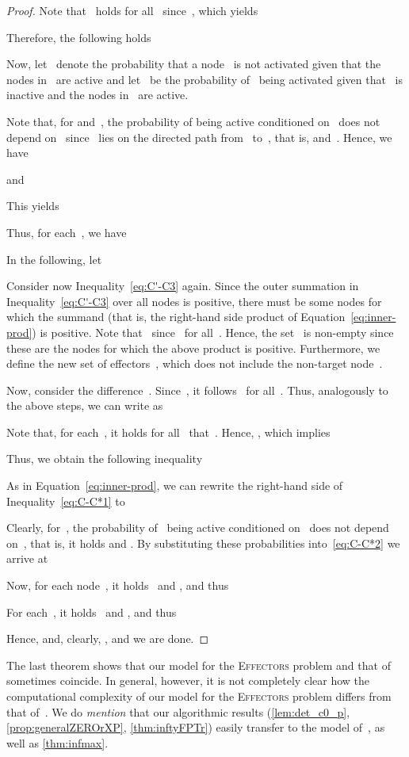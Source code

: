 \documentclass{article}
\newcommand{\probEffectors}{\textsc{Effectors}\xspace}
\begin{document}
\begin{proof}
  Note that~ holds for all~
  since~, which yields
  
  Therefore, the following holds
  
  Now, let~ denote the probability that a
  node~ is not activated given that the nodes in~ are active
  and let~ be the probability
  of~ being activated given that~ is inactive
  and the nodes in~ are active.

  Note that, for  and~,
  the probability of  being active conditioned on~ does
  not depend on~ since~ lies on the directed path from~
  to~, that is,  and~.
  Hence, we have
  
  and
  
  This yields
  
  Thus, for each~, we have 
  
  In the following, let
  
  
  Consider now Inequality~\eqref{eq:C'-C3} again.
  Since the outer summation in Inequality~\eqref{eq:C'-C3} over all nodes  is positive,
  there must be some nodes  for which the summand (that
  is, the right-hand side product of Equation~\eqref{eq:inner-prod})
  is positive.
  Note that~ since~ for all~.
  Hence, the set~ is non-empty
  since these are the nodes for which the above product is positive.
  Furthermore, we define the new set of effectors~,
  which does not include the non-target node~.

  Now, consider the difference~.
  Since~, it follows~
  for all~.
  Thus, analogously to the above steps, we can write
   as
  
  Note that, for each~, it holds for
  all~ that~.
  Hence, , which implies
  
  Thus, we obtain the following inequality
  
  As in Equation~\eqref{eq:inner-prod}, we can rewrite the right-hand side of Inequality~\eqref{eq:C-C*1} to
  
  Clearly, for~, the probability of~ being
  active conditioned on~ does not depend on~,
  that is, it holds
     and
    .
  By substituting these probabilities into~\eqref{eq:C-C*2} we
  arrive at

  

  Now, for each node~, it holds~ and
  , and thus
  
  For each~, it holds~ and
  ,
  and thus 
  
  Hence,  and, clearly, , and we are done.   
\end{proof}


The last theorem shows that our model for the \probEffectors problem and that of~\citet{LTGMH10} sometimes coincide.
In general,
however,
it is not completely clear how the computational complexity of our model for the \probEffectors problem
differs from that of~\citet{LTGMH10}.
We do \emph{mention} that our algorithmic results
(\autoref{lem:det_c0_p},
\autoref{prop:generalZEROrXP},
\autoref{thm:inftyFPTr})
easily transfer to the model of~\citet{LTGMH10},
as well as \autoref{thm:infmax}.
\end{document}
